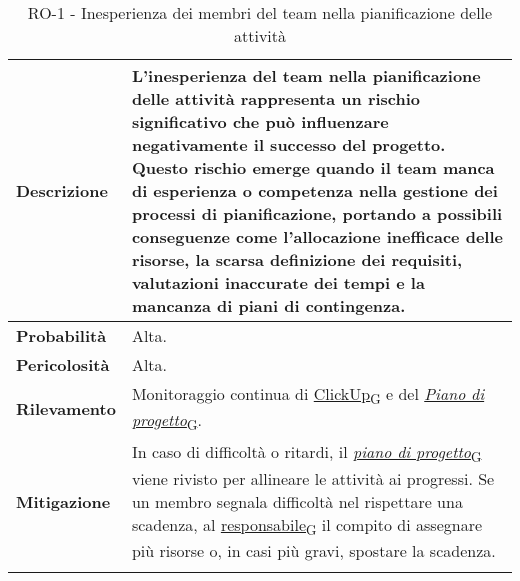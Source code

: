 \begin{longtable}{ | l | p{12cm} | }
	\hline
	\textbf{Descrizione}  & L'inesperienza del team nella pianificazione delle attività rappresenta un rischio significativo che può influenzare negativamente il successo del progetto. Questo rischio emerge quando il team manca di esperienza o competenza nella gestione dei processi di pianificazione, portando a possibili conseguenze come l'allocazione inefficace delle risorse, la scarsa definizione dei requisiti, valutazioni inaccurate dei tempi e la mancanza di piani di contingenza. \\
	\hline
	\textbf{Probabilità}  & Alta.                                                                                                                                                                                                                                                                                                                                                                                                                                                                        \\
	\hline
	\textbf{Pericolosità} & Alta.                                                                                                                                                                                                                                                                                                                                                                                                                                                                        \\
	\hline
	\textbf{Rilevamento}  & Monitoraggio continua di \href{https://7last.github.io/docs/rtb/documentazione-interna/glossario\#clickup}{ClickUp\textsubscript{G}} e del \href{https://7last.github.io/docs/rtb/documentazione-interna/glossario#piano-di-progetto}{\textit{Piano di progetto}\textsubscript{G}}.                                                                                                                                                                                                                                                                                              \\
	\hline
	\textbf{Mitigazione}  & In caso di difficoltà o ritardi, il \href{https://7last.github.io/docs/rtb/documentazione-interna/glossario#piano-di-progetto}{\textit{piano di progetto}\textsubscript{G}} viene rivisto per allineare le attività ai progressi. Se un membro segnala difficoltà nel rispettare una scadenza, al \href{https://7last.github.io/docs/rtb/documentazione-interna/glossario\#responsabile}{responsabile\textsubscript{G}} il compito di assegnare più risorse o, in casi più gravi, spostare la scadenza.                                                                               \\
	\hline
	\caption{RO-1 - Inesperienza dei membri del team nella pianificazione delle attività}
\end{longtable}

